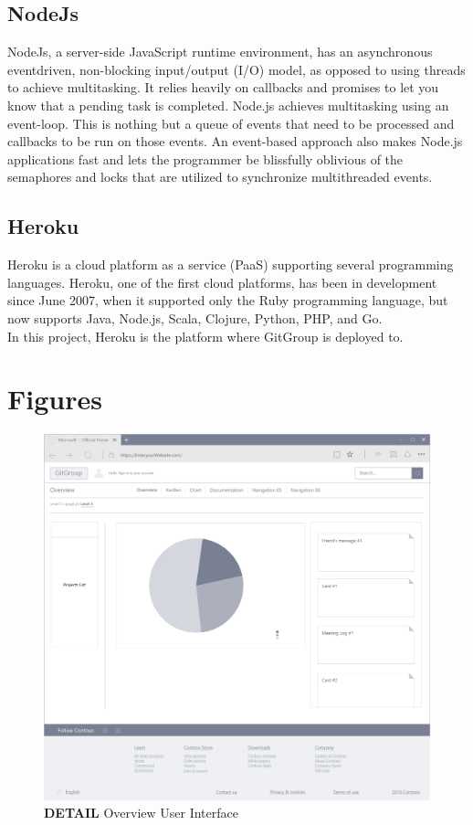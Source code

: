 \documentclass[12pt,a4paper]{report}
\begin{document}
\section{NodeJs}
NodeJs, \cite{wiki:nodejs} a server-side JavaScript runtime environment, has an asynchronous eventdriven, non-blocking input/output (I/O) model, as opposed to using threads to achieve multitasking. It relies heavily on callbacks and promises to let you know that a pending task is completed. Node.js achieves multitasking using an event-loop. This is nothing but a queue of events that need to be processed and callbacks to be run on those events. An event-based approach also makes Node.js applications fast and lets the programmer be blissfully oblivious of the semaphores and locks that are utilized to synchronize multithreaded events.  
\section{Heroku}
Heroku \cite{wiki:heroku} is a cloud platform as a service (PaaS) supporting several programming languages. Heroku, one of the first cloud platforms, has been in development since June 2007, when it supported only the Ruby programming language, but now supports Java, Node.js, Scala, Clojure, Python, PHP, and Go.\\
In this project, Heroku is the platform where GitGroup is deployed to.



\cleardoublepage
\appendix
\chapter{Figures}%

\begin{figure}[h]
	\centering
	\includegraphics[width=\textwidth]{./pics/OverviewInterface.png}
	\caption{\textbf{DETAIL} Overview User Interface}
\end{figure}
\end{document}

